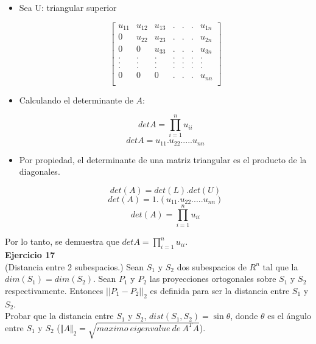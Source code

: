 \documentclass[12pt]{article}
\begin{document}
\begin{itemize}
    \item Sea U: triangular superior
    
            \[\left[\begin{array}{ccccccc}
                 u_{11} & u_{12} & u_{13} & . & . & . & u_{1n}  \\
                 0      & u_{22} & u_{23} & . & . & . & u_{2n}  \\
                 0      &   0    & u_{33} & . & . & . & u_{3n}  \\
                 .      &   .    &  .     & . & . & . &   .     \\
                 .      &   .    &  .     & . & . & . &   .     \\
                 .      &   .    &  .     & . & . & . &   .     \\
                 0      &   0    &  0     & . & . & . & u_{nn}  \\
                 
            \end{array}\right]\]
            
    \item Calculando el determinante de $A$:
    
        \[det A = \prod_{i=1}^{n} u_{ii}\]
        \[det A = u_{11}.u_{22}. ... .u_{nn} \] 
        
    \item Por propiedad, el determinante de una matriz triangular es el producto de la diagonales.
    
        \[det(A) = det(L).det(U)\]
        \[det(A) = 1.(u_{11}.u_{22}. ... .u_{nn})\]
        \[det(A) = \prod_{i=1}^{n} u_{ii} \]
\end{itemize}

Por lo tanto, se demuestra que $det A = \prod_{i=1}^n u_{ii}$.\\

\noindent \textbf{Ejercicio 17}\\
(Distancia entre 2 subespacios.) Sean $S_1$ y $S_2$ dos subespacios de $R^{n}$ tal que la $dim(S_1)=dim(S_2)$. Sean $P_1$ y $P_2$ las proyecciones ortogonales sobre $S_1$ y $S_2$ respectivamente. Entonces $\vert\vert P_1-P_2 \vert\vert_2$ es definida para ser la distancia entre $S_1$ y $S_2$.\\
Probar que la distancia entre $S_1$ y $S_2$, $dist(S_1,S_2)=\sin{\theta}$, donde $\theta$ es el ángulo entre $S_1$ y $S_2$ ($\Vert A \Vert_2=\sqrt{maximo\ eigenvalue\ de\ A^TA}$).\\
\end{document}
